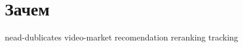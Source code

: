 \section{Зачем}

    {nead-dublicates}
    {video-market}
    {recomendation}
    {reranking}
    {tracking}


